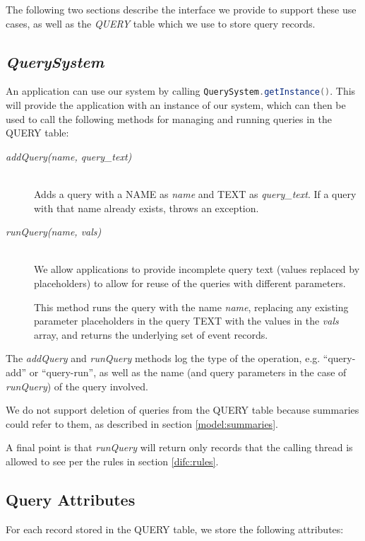 The following two sections describe the interface we provide to support these use cases, as well as the \emph{QUERY} table which we use to store query records.

\subsection{\emph{QuerySystem}}
\label{model:query-system}

An application can use our system by calling \lstinline[language=Java]$QuerySystem.getInstance()$. This will provide the application with an instance of our system, which can then be used to call the following methods for managing and running queries in the QUERY table:
\begin{description}
  \item[\emph{addQuery(name, query\_text)}] \ \\
    Adds a query with a NAME as \emph{name}
    and TEXT as \emph{query\_text}. If a query with that
    name already exists, throws an exception.
  \item[\emph{runQuery(name, vals)}] \ \\
    We allow applications to provide incomplete
    query text (values replaced by placeholders)
    to allow for reuse of the queries with
    different parameters.

    This method runs the query with the name \emph{name}, 
    replacing any existing
    parameter placeholders in the query TEXT with
    the values in the \emph{vals} array, and 
    returns the underlying set of event records.
\end{description}

\noindent
The \emph{addQuery} and \emph{runQuery} methods log the type of the operation, e.g. ``query-add'' or ``query-run'', as well as the name (and query parameters in the case of \emph{runQuery}) of the query involved.

We do not support deletion of queries from the QUERY table because summaries could refer to them, as described in section \ref{model:summaries}.

A final point is that \emph{runQuery} will return only records that the calling thread is allowed to see per the rules in section \ref{difc:rules}.

\subsection{Query Attributes}

For each record stored in the QUERY table, we store the following attributes:

